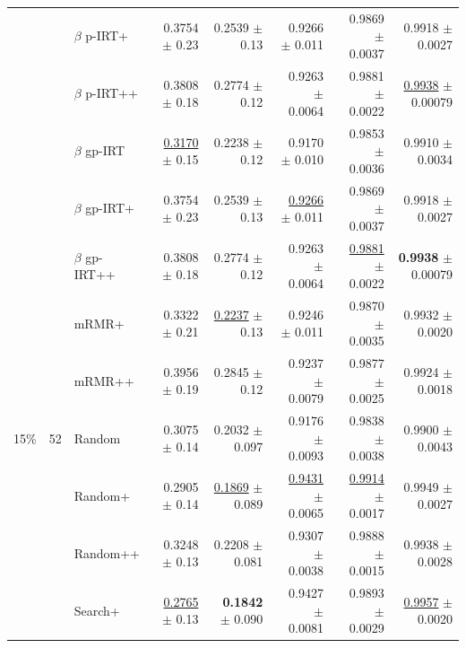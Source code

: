 \begin{longtable}{llp{}rrrrr}
 &  & $\beta$ p-IRT+ & 0.3754 {\scriptsize $\pm$ 0.23} & 0.2539 {\scriptsize $\pm$ 0.13} & 0.9266 {\scriptsize $\pm$ 0.011} & 0.9869 {\scriptsize $\pm$ 0.0037} & 0.9918 {\scriptsize $\pm$ 0.0027} \\
 &  & $\beta$ p-IRT++ & 0.3808 {\scriptsize $\pm$ 0.18} & 0.2774 {\scriptsize $\pm$ 0.12} & 0.9263 {\scriptsize $\pm$ 0.0064} & 0.9881 {\scriptsize $\pm$ 0.0022} & \underline{0.9938} {\scriptsize $\pm$ 0.00079} \\
 &  & $\beta$ gp-IRT & \underline{0.3170} {\scriptsize $\pm$ 0.15} & 0.2238 {\scriptsize $\pm$ 0.12} & 0.9170 {\scriptsize $\pm$ 0.010} & 0.9853 {\scriptsize $\pm$ 0.0036} & 0.9910 {\scriptsize $\pm$ 0.0034} \\
 &  & $\beta$ gp-IRT+ & 0.3754 {\scriptsize $\pm$ 0.23} & 0.2539 {\scriptsize $\pm$ 0.13} & \underline{0.9266} {\scriptsize $\pm$ 0.011} & 0.9869 {\scriptsize $\pm$ 0.0037} & 0.9918 {\scriptsize $\pm$ 0.0027} \\
 &  & $\beta$ gp-IRT++ & 0.3808 {\scriptsize $\pm$ 0.18} & 0.2774 {\scriptsize $\pm$ 0.12} & 0.9263 {\scriptsize $\pm$ 0.0064} & \underline{0.9881} {\scriptsize $\pm$ 0.0022} & \textbf{0.9938} {\scriptsize $\pm$ 0.00079} \\
 &  & mRMR+ & 0.3322 {\scriptsize $\pm$ 0.21} & \underline{0.2237} {\scriptsize $\pm$ 0.13} & 0.9246 {\scriptsize $\pm$ 0.011} & 0.9870 {\scriptsize $\pm$ 0.0035} & 0.9932 {\scriptsize $\pm$ 0.0020} \\
 &  & mRMR++ & 0.3956 {\scriptsize $\pm$ 0.19} & 0.2845 {\scriptsize $\pm$ 0.12} & 0.9237 {\scriptsize $\pm$ 0.0079} & 0.9877 {\scriptsize $\pm$ 0.0025} & 0.9924 {\scriptsize $\pm$ 0.0018} \\
\midrule
15\% & 52 & Random & 0.3075 {\scriptsize $\pm$ 0.14} & 0.2032 {\scriptsize $\pm$ 0.097} & 0.9176 {\scriptsize $\pm$ 0.0093} & 0.9838 {\scriptsize $\pm$ 0.0038} & 0.9900 {\scriptsize $\pm$ 0.0043} \\
 &  & Random+ & 0.2905 {\scriptsize $\pm$ 0.14} & \underline{0.1869} {\scriptsize $\pm$ 0.089} & \underline{0.9431} {\scriptsize $\pm$ 0.0065} & \underline{0.9914} {\scriptsize $\pm$ 0.0017} & 0.9949 {\scriptsize $\pm$ 0.0027} \\
 &  & Random++ & 0.3248 {\scriptsize $\pm$ 0.13} & 0.2208 {\scriptsize $\pm$ 0.081} & 0.9307 {\scriptsize $\pm$ 0.0038} & 0.9888 {\scriptsize $\pm$ 0.0015} & 0.9938 {\scriptsize $\pm$ 0.0028} \\
 &  & Search+ & \underline{0.2765} {\scriptsize $\pm$ 0.13} & \textbf{0.1842} {\scriptsize $\pm$ 0.090} & 0.9427 {\scriptsize $\pm$ 0.0081} & 0.9893 {\scriptsize $\pm$ 0.0029} & \underline{0.9957} {\scriptsize $\pm$ 0.0020} \\

\end{longtable}
